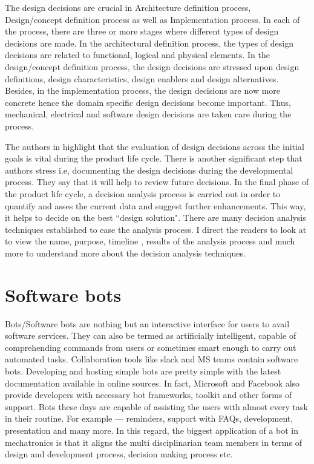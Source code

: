 The design decisions are crucial in Architecture definition process, Design/concept definition process as well as Implementation process. In each of the process, there are three or more stages where different types of design decisions are made. In the architectural definition process, the types of design decisions are related to functional, logical and physical elements. In the design/concept definition process, the design decisions are stressed upon design definitions, design characteristics, design enablers and design alternatives. Besides, in the implementation process, the design decisions are now more concrete hence the domain specific design decisions become important. Thus, mechanical, electrical and software design decisions are taken care during the process. 

The authors in \cite{irshorn2007} highlight that the evaluation of design decisions across the initial goals is vital during the product life cycle. There is another significant step that authors stress i.e, documenting the design decisions during the developmental process. They say that it will help to review future decisions.
In the final phase of the product life cycle, a decision analysis process is carried out in order to quantify and asses the current data and suggest further enhancements. This way, it helps to decide on the best ``design solution". There are many decision analysis techniques established to ease the analysis process. I direct the readers to look at \cite{irshorn2007} to view the name, purpose, timeline , results of the analysis process and much more to understand more about the decision analysis techniques.

\section{Software bots}  Bots/Software bots are nothing but an interactive interface for users to avail software services. They can also be termed as artificially intelligent, capable of comprehending commands from users or sometimes smart enough to carry out automated tasks. Collaboration tools like slack and MS teams contain software bots. Developing and hosting simple bots are pretty simple with the latest documentation available in online sources. In fact, Microsoft and Facebook also provide developers with necessary bot frameworks, toolkit and other forms of support. Bots these days are capable of assisting the users with almost every task in their routine\cite{lebeuf_software_2018}. For example --- reminders, support with FAQs, development, presentation and many more. In this regard, the biggest application of a bot in mechatronics is that it aligns the multi disciplinarian team members in terms of design and development process, decision making process etc\cite{storey_botse_nodate}.


